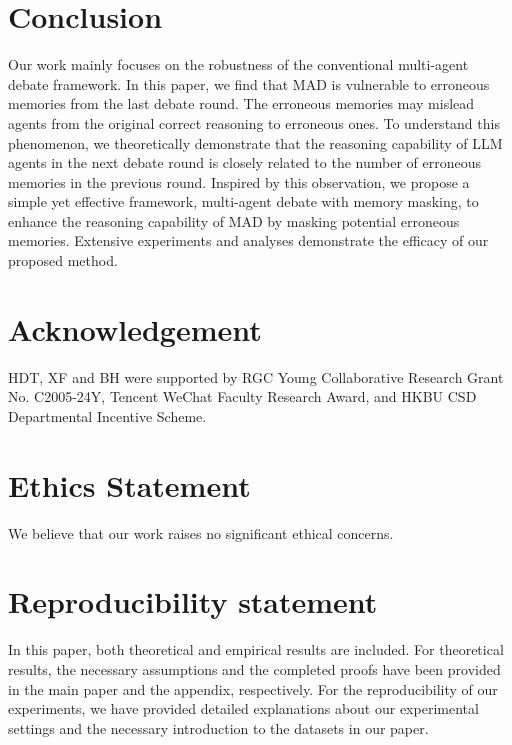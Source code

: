 \documentclass{article} %
\theoremstyle{plain}
\begin{document}
\vspace{-8pt}
\section{Conclusion}
\vspace{-6pt}
Our work mainly focuses on the robustness of the conventional multi-agent debate framework. In this paper, we find that MAD is vulnerable to erroneous memories from the last debate round. The erroneous memories may mislead agents from the original correct reasoning to erroneous ones. To understand this phenomenon, we theoretically demonstrate that the reasoning capability of LLM agents in the next debate round is closely related to the number of erroneous memories in the previous round. Inspired by this observation, we propose a simple yet effective framework, multi-agent debate with memory masking, to enhance the reasoning capability of MAD by masking potential erroneous memories. Extensive experiments and analyses demonstrate the efficacy of our proposed method.

\clearpage
\section*{Acknowledgement}
HDT, XF and BH were supported by RGC Young Collaborative Research Grant No. C2005-24Y, Tencent WeChat Faculty Research Award, and HKBU CSD Departmental Incentive Scheme.


\section*{Ethics Statement}
We believe that our work raises no significant ethical concerns.
\section*{Reproducibility statement}
In this paper, both theoretical and empirical results are included. For theoretical results, the necessary assumptions and the completed proofs have been provided in the main paper and the appendix, respectively. For the reproducibility of our experiments, we have provided detailed explanations about our experimental settings and the necessary introduction to the datasets in our paper. 


\end{document}
